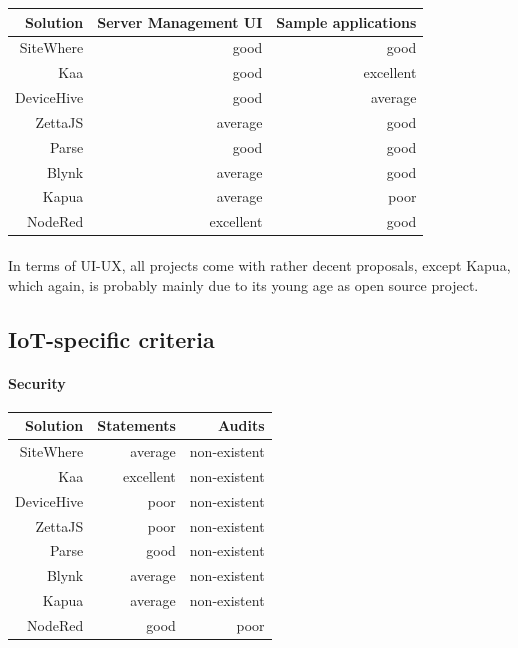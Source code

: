 \documentclass{article}
\begin{document}
\begin{center}
\begin{tabular}{r|r|r}
Solution & Server Management UI	& Sample applications \\ \hline
SiteWhere & \cellcolor{blue!10}good & \cellcolor{blue!10}good \\
Kaa & \cellcolor{blue!10}good & \cellcolor{green!25}excellent \\
DeviceHive & \cellcolor{blue!10}good & \cellcolor{yellow!25}average \\
ZettaJS & \cellcolor{yellow!25}average & \cellcolor{blue!10}good \\
Parse & \cellcolor{blue!10}good & \cellcolor{blue!10}good \\
Blynk & \cellcolor{yellow!25}average & \cellcolor{blue!10}good \\
Kapua & \cellcolor{yellow!25}average & \cellcolor{orange!25}poor \\
NodeRed & \cellcolor{green!25}excellent & \cellcolor{blue!10}good \\
\end{tabular}
\end{center}

\paragraph{} In terms of UI-UX, all projects come with rather decent proposals, except Kapua, which again, is probably mainly due to its young age as open source project.

\newpage

\subsection{IoT-specific criteria}

\paragraph{Security}

\begin{center}
\begin{tabular}{r|r|r}
Solution & Statements & Audits \\ \hline
SiteWhere & \cellcolor{yellow!25}average & \cellcolor{red!25}non-existent \\
Kaa & \cellcolor{green!25}excellent & \cellcolor{red!25}non-existent \\
DeviceHive & \cellcolor{orange!25}poor & \cellcolor{red!25}non-existent \\
ZettaJS & \cellcolor{orange!25}poor & \cellcolor{red!25}non-existent \\
Parse & \cellcolor{blue!10}good & \cellcolor{red!25}non-existent \\
Blynk & \cellcolor{yellow!25}average & \cellcolor{red!25}non-existent \\
Kapua & \cellcolor{yellow!25}average & \cellcolor{red!25}non-existent \\
NodeRed & \cellcolor{blue!10}good & \cellcolor{orange!25}poor \\
\end{tabular}
\end{center}
\end{document}
